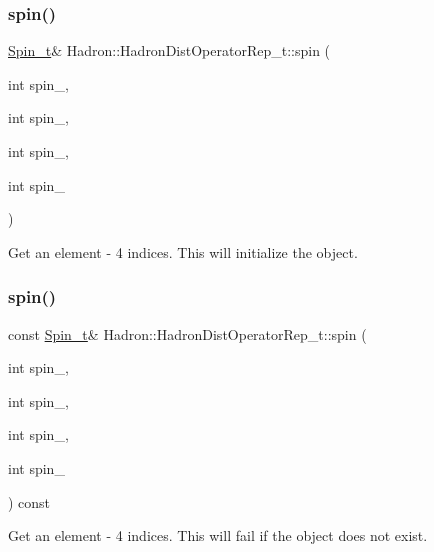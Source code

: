 \subsubsection{\texorpdfstring{spin()}{spin()}\hspace{0.1cm}{\footnotesize\ttfamily [10/16]}}
{\footnotesize\ttfamily \mbox{\hyperlink{structHadron_1_1HadronDistOperatorRep__t_1_1Spin__t}{Spin\+\_\+t}}\& Hadron\+::\+Hadron\+Dist\+Operator\+Rep\+\_\+t\+::spin (\begin{DoxyParamCaption}\item[{int}]{spin\+\_,  }\item[{int}]{spin\+\_,  }\item[{int}]{spin\+\_,  }\item[{int}]{spin\+\_ }\end{DoxyParamCaption})}



Get an element -\/ 4 indices. This will initialize the object. 

\mbox{\label{classHadron_1_1HadronDistOperatorRep__t_a4e5de005933a0604179b38b5aa483a77}} 
\subsubsection{\texorpdfstring{spin()}{spin()}\hspace{0.1cm}{\footnotesize\ttfamily [11/16]}}
{\footnotesize\ttfamily const \mbox{\hyperlink{structHadron_1_1HadronDistOperatorRep__t_1_1Spin__t}{Spin\+\_\+t}}\& Hadron\+::\+Hadron\+Dist\+Operator\+Rep\+\_\+t\+::spin (\begin{DoxyParamCaption}\item[{int}]{spin\+\_,  }\item[{int}]{spin\+\_,  }\item[{int}]{spin\+\_,  }\item[{int}]{spin\+\_ }\end{DoxyParamCaption}) const}



Get an element -\/ 4 indices. This will fail if the object does not exist. 

\mbox{\label{classHadron_1_1HadronDistOperatorRep__t_a61528fe44909a8f4926e21b54681c1e0}} 
